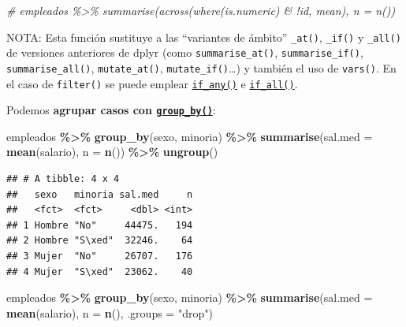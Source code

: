 \documentclass[
]{book}
\newenvironment{Shaded}{\begin{snugshade}}{\end{snugshade}}
\newcommand{\AttributeTok}[1]{\textcolor[rgb]{0.13,0.29,0.53}{#1}}
\newcommand{\CommentTok}[1]{\textcolor[rgb]{0.56,0.35,0.01}{\textit{#1}}}
\newcommand{\FunctionTok}[1]{\textcolor[rgb]{0.13,0.29,0.53}{\textbf{#1}}}
\newcommand{\NormalTok}[1]{#1}
\newcommand{\SpecialCharTok}[1]{\textcolor[rgb]{0.81,0.36,0.00}{\textbf{#1}}}
\newcommand{\StringTok}[1]{\textcolor[rgb]{0.31,0.60,0.02}{#1}}
\begin{document}
\begin{Shaded}
\begin{Highlighting}[]
\CommentTok{\# empleados \%\textgreater{}\% summarise(across(where(is.numeric) \& !id, mean), n = n())}
\end{Highlighting}
\end{Shaded}

NOTA: Esta función sustituye a las ``variantes de ámbito'' \texttt{\_at()}, \texttt{\_if()} y \texttt{\_all()} de versiones anteriores de dplyr (como \texttt{summarise\_at()}, \texttt{summarise\_if()}, \texttt{summarise\_all()}, \texttt{mutate\_at()}, \texttt{mutate\_if()}\ldots) y también el uso de \texttt{vars()}.
En el caso de \texttt{filter()} se puede emplear \href{https://dplyr.tidyverse.org/reference/across.html}{\texttt{if\_any()}} e \href{https://dplyr.tidyverse.org/reference/across.html}{\texttt{if\_all()}}.

Podemos \textbf{agrupar casos con \href{https://dplyr.tidyverse.org/reference/group_by.html}{\texttt{group\_by()}}}:

\begin{Shaded}
\begin{Highlighting}[]
\NormalTok{empleados }\SpecialCharTok{\%\textgreater{}\%} \FunctionTok{group\_by}\NormalTok{(sexo, minoria) }\SpecialCharTok{\%\textgreater{}\%} 
    \FunctionTok{summarise}\NormalTok{(}\AttributeTok{sal.med =} \FunctionTok{mean}\NormalTok{(salario), }\AttributeTok{n =} \FunctionTok{n}\NormalTok{()) }\SpecialCharTok{\%\textgreater{}\%}
    \FunctionTok{ungroup}\NormalTok{()}
\end{Highlighting}
\end{Shaded}

\begin{verbatim}
## # A tibble: 4 x 4
##   sexo   minoria sal.med     n
##   <fct>  <fct>     <dbl> <int>
## 1 Hombre "No"     44475.   194
## 2 Hombre "S\xed"  32246.    64
## 3 Mujer  "No"     26707.   176
## 4 Mujer  "S\xed"  23062.    40
\end{verbatim}

\begin{Shaded}
\begin{Highlighting}[]
\NormalTok{empleados }\SpecialCharTok{\%\textgreater{}\%} \FunctionTok{group\_by}\NormalTok{(sexo, minoria) }\SpecialCharTok{\%\textgreater{}\%} 
    \FunctionTok{summarise}\NormalTok{(}\AttributeTok{sal.med =} \FunctionTok{mean}\NormalTok{(salario), }\AttributeTok{n =} \FunctionTok{n}\NormalTok{(), }\AttributeTok{.groups =} \StringTok{"drop"}\NormalTok{)}
\end{Highlighting}
\end{Shaded}
\end{document}
